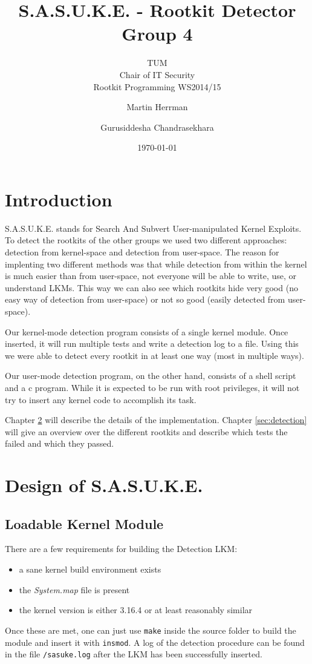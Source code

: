 \documentclass[10pt, letterpaper]{scrartcl}
\title{S.A.S.U.K.E. - Rootkit Detector Group 4}
\subtitle{TUM \\Chair of IT Security\\  Rootkit Programming WS2014/15}
\author{Martin Herrman \and Gurusiddesha Chandrasekhara}
\date{\today}
\begin{document}
\maketitle
\tableofcontents
\newpage

\section{Introduction}
S.A.S.U.K.E. stands for Search And Subvert User-manipulated Kernel Exploits.
To detect the rootkits of the other groups we used two different approaches: detection from kernel-space and detection from user-space.
The reason for implenting two different methods was that while detection from within the kernel is much easier than from user-space, not everyone will be able to write, use, or understand LKMs.
This way we can also see which rootkits hide very good (no easy way of detection from user-space) or not so good (easily detected from user-space). 

Our kernel-mode detection program consists of a single kernel module.
Once inserted, it will run multiple tests and write a detection log to a file.
Using this we were able to detect every rootkit in at least one way (most in multiple ways).

Our user-mode detection program, on the other hand, consists of a shell script and a c program.
While it is expected to be run with root privileges, it will not try to insert any kernel code to accomplish its task.

Chapter \ref{sec:design} will describe the details of the implementation. Chapter \ref{sec:detection} will give an overview over the different rootkits and describe which tests the failed and which they passed.

\section{Design of S.A.S.U.K.E.}\label{sec:design}

\subsection{Loadable Kernel Module}\label{sec:lkm}
There are a few requirements for building the Detection LKM: 
\begin{itemize}
	\item a sane kernel build environment exists
	\item the \emph{System.map} file is present
	\item the kernel version is either 3.16.4 or at least reasonably similar
\end{itemize}
Once these are met, one can just use \texttt{make} inside the source folder to build the module and insert it with \texttt{insmod}. A log of the detection procedure can be found in the file \texttt{/sasuke.log} after the LKM has been successfully inserted.
\end{document}
